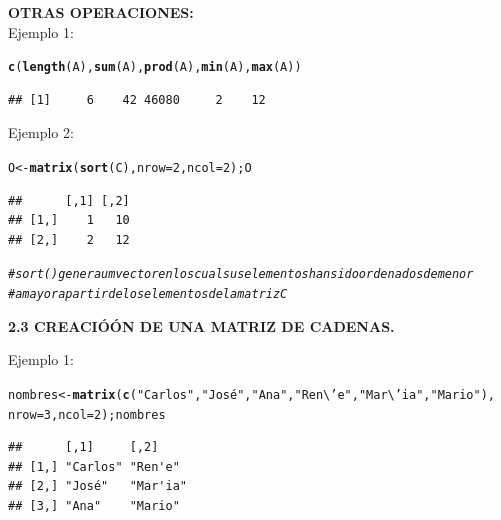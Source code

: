 \documentclass[12pt,letterpaper]{article}\usepackage[]{graphicx}\usepackage[]{color}
\makeatletter
\newcommand{\hlnum}[1]{\textcolor[rgb]{0.686,0.059,0.569}{#1}}%
\newcommand{\hlstr}[1]{\textcolor[rgb]{0.192,0.494,0.8}{#1}}%
\newcommand{\hlcom}[1]{\textcolor[rgb]{0.678,0.584,0.686}{\textit{#1}}}%
\newcommand{\hlstd}[1]{\textcolor[rgb]{0.345,0.345,0.345}{#1}}%
\newcommand{\hlkwb}[1]{\textcolor[rgb]{0.69,0.353,0.396}{#1}}%
\newcommand{\hlkwc}[1]{\textcolor[rgb]{0.333,0.667,0.333}{#1}}%
\newcommand{\hlkwd}[1]{\textcolor[rgb]{0.737,0.353,0.396}{\textbf{#1}}}%
\newenvironment{kframe}{%
 \def\at@end@of@kframe{}%
 \ifinner\ifhmode%
  \def\at@end@of@kframe{\end{minipage}}%
  \begin{minipage}{\columnwidth}%
 \fi\fi%
 \def\FrameCommand##1{\hskip\@totalleftmargin \hskip-\fboxsep
 \colorbox{shadecolor}{##1}\hskip-\fboxsep
     \hskip-\linewidth \hskip-\@totalleftmargin \hskip\columnwidth}%
 \MakeFramed {\advance\hsize-\width
   \@totalleftmargin\z@ \linewidth\hsize
   \@setminipage}}%
 {\par\unskip\endMakeFramed%
 \at@end@of@kframe}
\newenvironment{knitrout}{}{} %
\makeatother
\begin{document}
\textbf{OTRAS OPERACIONES:}\\

Ejemplo 1:
\begin{knitrout}
\color{fgcolor}\begin{kframe}
\begin{alltt}
 \hlkwd{c}\hlstd{(}\hlkwd{length}\hlstd{(A),} \hlkwd{sum}\hlstd{(A),} \hlkwd{prod}\hlstd{(A),} \hlkwd{min}\hlstd{(A),} \hlkwd{max}\hlstd{(A))}
\end{alltt}
\begin{verbatim}
## [1]     6    42 46080     2    12
\end{verbatim}
\end{kframe}
\end{knitrout}

Ejemplo 2:
\begin{knitrout}
\color{fgcolor}\begin{kframe}
\begin{alltt}
\hlstd{O} \hlkwb{<-} \hlkwd{matrix}\hlstd{(}\hlkwd{sort}\hlstd{(C),} \hlkwc{nrow}\hlstd{=}\hlnum{2}\hlstd{,} \hlkwc{ncol}\hlstd{=}\hlnum{2}\hlstd{); O}
\end{alltt}
\begin{verbatim}
##      [,1] [,2]
## [1,]    1   10
## [2,]    2   12
\end{verbatim}
\begin{alltt}
\hlcom{#sort() genera um vector en los cual sus elementos han sido ordenados de menor }
\hlcom{#a mayor a partir de los elementos de la matriz C}
\end{alltt}
\end{kframe}
\end{knitrout}

\begin{center}
\textbf{2.3  CREACIÓ\'ON DE UNA MATRIZ DE CADENAS.}
\end{center}

Ejemplo 1:
\begin{knitrout}
\color{fgcolor}\begin{kframe}
\begin{alltt}
\hlstd{nombres} \hlkwb{<-} \hlkwd{matrix}\hlstd{(}\hlkwd{c}\hlstd{(}\hlstr{"Carlos"}\hlstd{,} \hlstr{"José"}\hlstd{,} \hlstr{"Ana"}\hlstd{,} \hlstr{"Ren\textbackslash{}'e"}\hlstd{,} \hlstr{"Mar\textbackslash{}'ia"}\hlstd{,} \hlstr{"Mario"}\hlstd{),}
\hlkwc{nrow}\hlstd{=}\hlnum{3}\hlstd{,} \hlkwc{ncol}\hlstd{=}\hlnum{2}\hlstd{); nombres}
\end{alltt}
\begin{verbatim}
##      [,1]     [,2]    
## [1,] "Carlos" "Ren'e" 
## [2,] "José"   "Mar'ia"
## [3,] "Ana"    "Mario"
\end{verbatim}
\end{kframe}
\end{knitrout}
\end{document}
